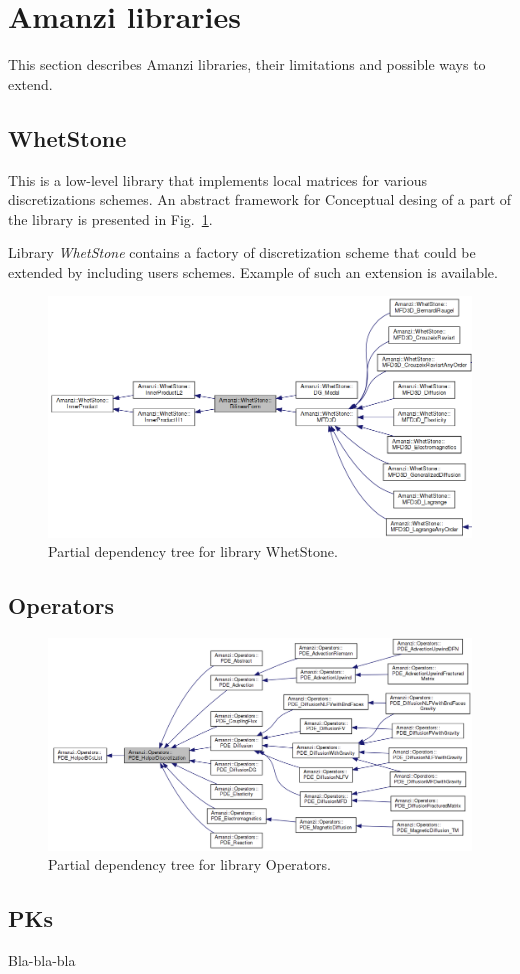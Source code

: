 \section{Amanzi libraries}

This section describes Amanzi libraries, their limitations and possible 
ways to extend.

\subsection{WhetStone}
This is a low-level library that implements local matrices for various 
discretizations schemes. 
An abstract framework for 
Conceptual desing of a part of the library is presented in Fig.~\ref{fig:whetstone}.

Library {\it WhetStone} contains a factory of discretization scheme that could
be extended by including users schemes.
Example of such an extension is available.


\begin{figure}[h!]
\includegraphics[width=1.0\textwidth]{figs/whetstone.png}
\caption{Partial dependency tree for library WhetStone.\label{fig:whetstone}}
\end{figure}

\subsection{Operators}

\begin{figure}[h!]
\includegraphics[width=1.0\textwidth]{figs/operators.png}
\caption{Partial dependency tree for library Operators.\label{fig:operators}}
\end{figure}


\subsection{PKs}

Bla-bla-bla

